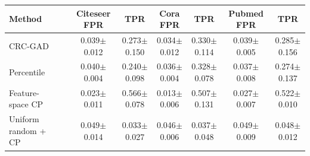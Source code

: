 \begin{tabular}{llcccccc}
\toprule
Method & & Citeseer FPR & TPR & Cora FPR & TPR & Pubmed FPR & TPR \\
\midrule
CRC-GAD & & 0.039$\pm$0.012 & 0.273$\pm$0.150 & 0.034$\pm$0.012 & 0.330$\pm$0.114 & 0.039$\pm$0.005 & 0.285$\pm$0.156 \\
Percentile & & 0.040$\pm$0.004 & 0.240$\pm$0.098 & 0.036$\pm$0.004 & 0.328$\pm$0.078 & 0.037$\pm$0.008 & 0.274$\pm$0.137 \\
Feature-space CP & & 0.023$\pm$0.011 & 0.566$\pm$0.078 & 0.013$\pm$0.006 & 0.507$\pm$0.131 & 0.027$\pm$0.007 & 0.522$\pm$0.010 \\
Uniform random + CP & & 0.049$\pm$0.014 & 0.033$\pm$0.027 & 0.046$\pm$0.006 & 0.037$\pm$0.048 & 0.049$\pm$0.009 & 0.048$\pm$0.012 \\
\bottomrule
\end{tabular}
